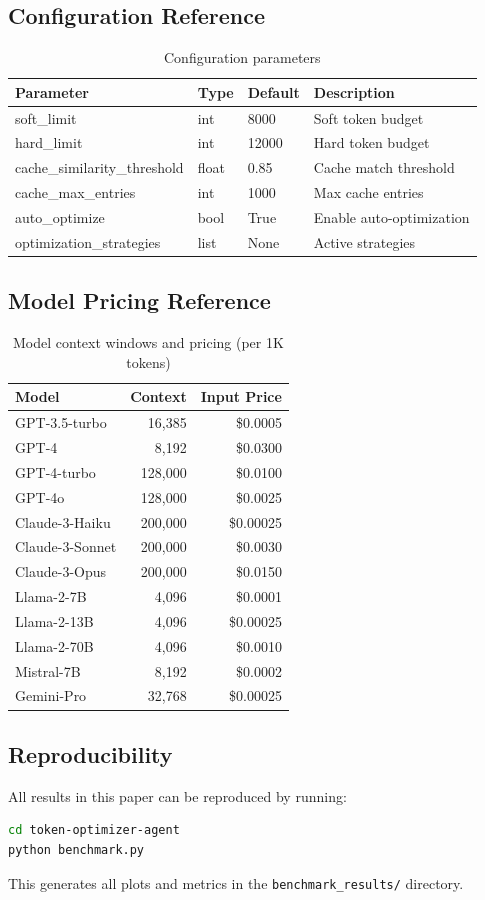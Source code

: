 \subsection{Configuration Reference}

\begin{table}[H]
\centering
\caption{Configuration parameters}
\label{tab:config}
\begin{tabular}{@{}llll@{}}
\toprule
\textbf{Parameter} & \textbf{Type} & \textbf{Default} & \textbf{Description} \\
\midrule
soft\_limit & int & 8000 & Soft token budget \\
hard\_limit & int & 12000 & Hard token budget \\
cache\_similarity\_threshold & float & 0.85 & Cache match threshold \\
cache\_max\_entries & int & 1000 & Max cache entries \\
auto\_optimize & bool & True & Enable auto-optimization \\
optimization\_strategies & list & None & Active strategies \\
\bottomrule
\end{tabular}
\end{table}

\subsection{Model Pricing Reference}

\begin{table}[H]
\centering
\caption{Model context windows and pricing (per 1K tokens)}
\label{tab:models}
\begin{tabular}{@{}lrr@{}}
\toprule
\textbf{Model} & \textbf{Context} & \textbf{Input Price} \\
\midrule
GPT-3.5-turbo & 16,385 & \$0.0005 \\
GPT-4 & 8,192 & \$0.0300 \\
GPT-4-turbo & 128,000 & \$0.0100 \\
GPT-4o & 128,000 & \$0.0025 \\
Claude-3-Haiku & 200,000 & \$0.00025 \\
Claude-3-Sonnet & 200,000 & \$0.0030 \\
Claude-3-Opus & 200,000 & \$0.0150 \\
Llama-2-7B & 4,096 & \$0.0001 \\
Llama-2-13B & 4,096 & \$0.00025 \\
Llama-2-70B & 4,096 & \$0.0010 \\
Mistral-7B & 8,192 & \$0.0002 \\
Gemini-Pro & 32,768 & \$0.00025 \\
\bottomrule
\end{tabular}
\end{table}

\subsection{Reproducibility}

All results in this paper can be reproduced by running:

\begin{lstlisting}[language=bash, caption=Reproducing results]
cd token-optimizer-agent
python benchmark.py
\end{lstlisting}

This generates all plots and metrics in the \texttt{benchmark\_results/} directory.
